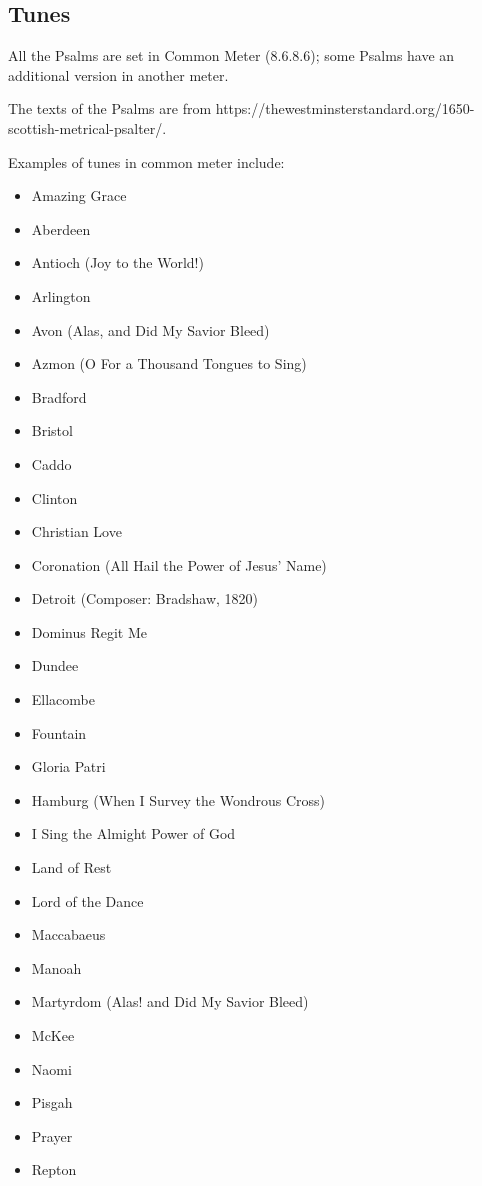 \subsection*{Tunes}

All the Psalms are set in Common Meter (8.6.8.6); some Psalms have an additional version in another meter.

The texts of the Psalms are from https://thewestminsterstandard.org/1650-scottish-metrical-psalter/.

Examples of tunes in common meter include:


\begin{itemize}
\sc\item Amazing Grace
  \item Aberdeen
	\item Antioch (\textup{Joy to the World!}) 
	\item Arlington
	\item Avon (Alas, and Did My Savior Bleed)
	\item Azmon (\textup{O For a Thousand Tongues to Sing})
	\item Bradford
	\item Bristol
	\item Caddo
	\item Clinton
	\item Christian Love
	\item Coronation \textup{(All Hail the Power of Jesus' Name)}
	\item Detroit (Composer: Bradshaw, 1820)
	\item Dominus Regit Me
	\item Dundee
	\item Ellacombe
	\item Fountain
	\item Gloria Patri
	\item Hamburg (\textup{When I Survey the Wondrous Cross})
  \item I Sing the Almight Power of God
	\item Land of Rest
	\item Lord of the Dance
	\item Maccabaeus
	\item Manoah
	\item Martyrdom (\textup{Alas! and Did My Savior Bleed})
	\item McKee
	\item Naomi
	\item Pisgah
	\item Prayer
	\item Repton

\end{itemize}
